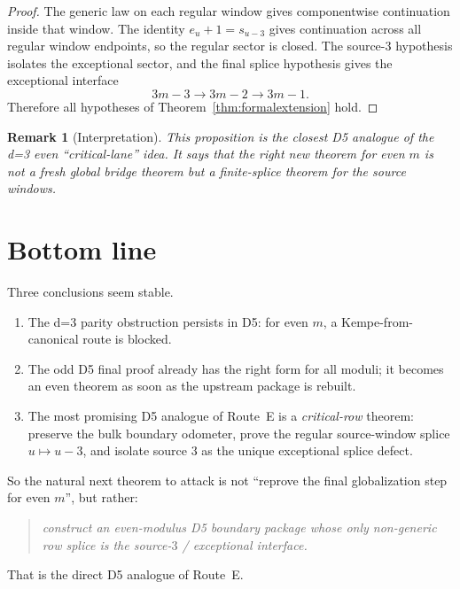 \documentclass[11pt]{article}
\newtheorem{remark}{Remark}
\begin{document}
\begin{proof}
The generic law on each regular window gives componentwise continuation inside
that window. The identity $e_u+1=s_{u-3}$ gives continuation across all regular
window endpoints, so the regular sector is closed. The source-$3$ hypothesis
isolates the exceptional sector, and the final splice hypothesis gives the
exceptional interface
\[
3m-3 \to 3m-2 \to 3m-1.
\]
Therefore all hypotheses of Theorem~\ref{thm:formalextension} hold.
\end{proof}

\begin{remark}[Interpretation]
This proposition is the closest D5 analogue of the d=3 even ``critical-lane''
idea. It says that the right new theorem for even $m$ is not a fresh global
bridge theorem but a finite-splice theorem for the source windows.
\end{remark}

\section{Bottom line}

Three conclusions seem stable.
\begin{enumerate}[label=\textup{(\arabic*)},leftmargin=2.5em]
    \item The d=3 parity obstruction persists in D5: for even $m$, a
    Kempe-from-canonical route is blocked.
    \item The odd D5 final proof already has the right form for all moduli; it
    becomes an even theorem as soon as the upstream package is rebuilt.
    \item The most promising D5 analogue of Route~E is a \emph{critical-row}
    theorem: preserve the bulk boundary odometer, prove the regular
    source-window splice $u\mapsto u-3$, and isolate source $3$ as the unique
    exceptional splice defect.
\end{enumerate}

So the natural next theorem to attack is not ``reprove the final globalization
step for even $m$'', but rather:
\begin{quote}
\emph{construct an even-modulus D5 boundary package whose only non-generic row
splice is the source-$3$ / exceptional interface.}
\end{quote}

That is the direct D5 analogue of Route~E.
\end{document}
